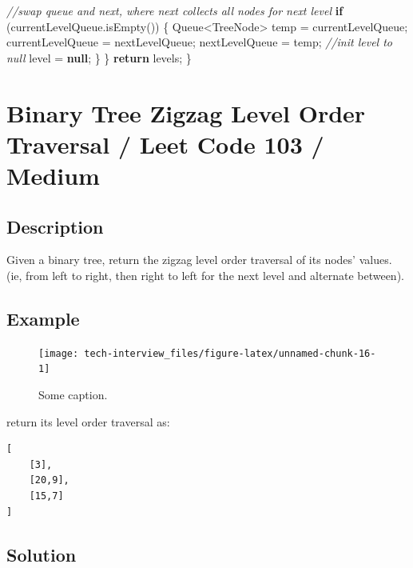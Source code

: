 \documentclass[]{book}
\newenvironment{Shaded}{\begin{snugshade}}{\end{snugshade}}
\newcommand{\BuiltInTok}[1]{#1}
\newcommand{\CommentTok}[1]{\textcolor[rgb]{0.56,0.35,0.01}{\textit{#1}}}
\newcommand{\FunctionTok}[1]{\textcolor[rgb]{0.00,0.00,0.00}{#1}}
\newcommand{\KeywordTok}[1]{\textcolor[rgb]{0.13,0.29,0.53}{\textbf{#1}}}
\newcommand{\NormalTok}[1]{#1}
\begin{document}
\begin{Shaded}
\begin{Highlighting}[]
        \CommentTok{//swap queue and next, where next collects all nodes for next level}
        \KeywordTok{if}\NormalTok{ (currentLevelQueue.}\FunctionTok{isEmpty}\NormalTok{()) \{}
            \BuiltInTok{Queue}\NormalTok{<}\BuiltInTok{TreeNode}\NormalTok{> temp = currentLevelQueue;}
\NormalTok{            currentLevelQueue = nextLevelQueue;}
\NormalTok{            nextLevelQueue = temp;}
            \CommentTok{//init level to null}
\NormalTok{            level = }\KeywordTok{null}\NormalTok{;}
\NormalTok{        \}}
\NormalTok{    \}}
    \KeywordTok{return}\NormalTok{ levels;}
\NormalTok{\}}
\end{Highlighting}
\end{Shaded}

\hypertarget{binary-tree-zigzag-level-order-traversal-leet-code-103-medium}{%
\section{Binary Tree Zigzag Level Order Traversal / Leet Code 103 / Medium}\label{binary-tree-zigzag-level-order-traversal-leet-code-103-medium}}

\hypertarget{description-56}{%
\subsection{Description}\label{description-56}}

Given a binary tree, return the zigzag level order traversal of its nodes' values. (ie, from left to right, then
right to left for the next level and alternate between).

\hypertarget{example-54}{%
\subsection{Example}\label{example-54}}

\begin{figure}
\texttt{[image: tech-interview\_files/figure-latex/unnamed-chunk-16-1]} \caption{Some caption.}\label{fig:unnamed-chunk-16}
\end{figure}

return its level order traversal as:

\begin{verbatim}
[
    [3],
    [20,9],
    [15,7]
]
\end{verbatim}

\hypertarget{solution-38}{%
\subsection{Solution}\label{solution-38}}
\end{document}
